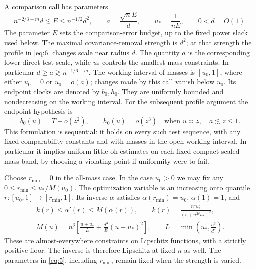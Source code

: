 A comparison call has parameters
\begin{equation}
 n^{-2/3+m}d\lesssim E\le n^{-1/2}d^2,
 \qquad a=\frac{\sqrt n E}{d},\qquad
 u_*=\frac1{nE},\qquad 0<d=O(1).
 \tag{3}\label{eq:3}
\end{equation}
The parameter $E$ sets the comparison-error budget, up to the fixed
power slack used below. The maximal covariance-removal strength is
$d^2$; at that strength the profile in \eqref{eq:6} changes scale near
radius $d$. The quantity $a$ is the corresponding lower direct-test
scale, while $u_*$ controls the smallest-mass constraints.
In particular $d\ge a\gtrsim n^{-1/6+m}$.  The working interval of masses
is $[u_0,1]$, where either $u_0=0$ or $u_0=o(a)$; changes made by this call
vanish below $u_0$.  Its endpoint clocks are denoted by $b_0,h_0$.  They are
uniformly bounded and nondecreasing on the working interval.  For the
subsequent profile argument the endpoint hypothesis is
\begin{equation}
 b_0(u)=T+o(z^2),\qquad h_0(u)=o(z^3)
 \quad\text{when }u\asymp z,\quad a\lesssim z\le1.
 \tag{4}\label{eq:4}
\end{equation}
This formulation is sequential: it holds on every such test sequence,
with any fixed comparability constants and with masses in the open
working interval.  In particular it implies uniform little-oh estimates
on each fixed compact scaled mass band, by choosing a violating point if
uniformity were to fail.

Choose $r_{\min}=0$ in the all-mass case.  In the case $u_0>0$ we may fix
any $0\le r_{\min}\le u_*/M(u_0)$.  The optimization variable is an
increasing onto quantile $r:[u_0,1]\to[r_{\min},1]$.  Its inverse
$\alpha$ satisfies $\alpha(r_{\min})=u_0$, $\alpha(1)=1$, and
\begin{equation}
 \begin{gathered}
 k(r)\le\alpha'(r)\le M(\alpha(r)),\qquad
 k(r)=\frac{n^\delta u_*^2}{(r+n^{2\delta}u_*)^2},\\
 M(u)=n^\delta\left[\frac{u+u_*}{L}
                  +\frac{d^3}{E}(u+u_*)^2\right],
 \qquad L=\min\left(u_*,\frac{a^3}{d^2}\right).
 \end{gathered}
 \tag{5}\label{eq:5}
\end{equation}
These are almost-everywhere constraints on Lipschitz functions, with a
strictly positive floor.  The inverse is therefore Lipschitz at fixed
$n$ as well.  The parameters in \eqref{eq:5}, including $r_{\min}$, remain
fixed when the strength is varied.

